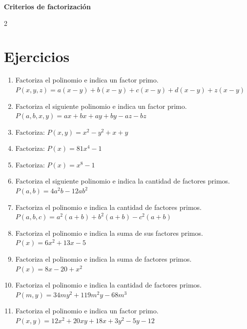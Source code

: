 \documentclass[10pt]{article}
\begin{document}
	\begin{center}
		\Large\bfseries Criterios de factorización
	\end{center}

\begin{multicols}{2}
	\section*{Ejercicios}
		\begin{enumerate}[label=\textbf{\arabic*.}, itemsep=0.4cm]
			\item Factoriza el polinomio e indica un factor primo. \\
			$P(x, y, z) = a(x - y) + b(x - y) + c(x - y) + d(x - y) + z(x - y)$

			\item Factoriza el siguiente polinomio e indica un factor primo. \\
			$P(a, b, x, y) = ax + bx + ay + by - az - bz$

			\item Factoriza: $P(x, y) = x^2 - y^2 + x + y$

			\item Factoriza: $P(x) = 81x^4 - 1$

			\item Factoriza: $P(x) = x^8 - 1$

			\item Factoriza el siguiente polinomio e indica la cantidad de factores primos. \\
			$P(a, b) = 4a^2 b - 12a b^2$

			\item Factoriza el polinomio e indica la cantidad de factores primos. \\
			$P(a, b, c) = a^2 (a + b) + b^2 (a + b) - c^2 (a + b)$

			\item Factoriza el polinomio e indica la suma de sus factores primos. \\
			$P(x) = 6x^2 + 13x - 5$

			\item Factoriza el polinomio e indica la suma de factores primos. \\
			$P(x) = 8x - 20 + x^2$

			\item Factoriza el polinomio e indica la cantidad de factores primos. \\
			$P(m, y) = 34m y^2 + 119m^2 y - 68m^3$

			\item Factoriza el polinomio e indica un factor primo. \\
			$P(x, y) = 12x^2 + 20xy + 18x + 3y^2 - 5y - 12$


\end{enumerate}
\end{multicols}
\end{document}
